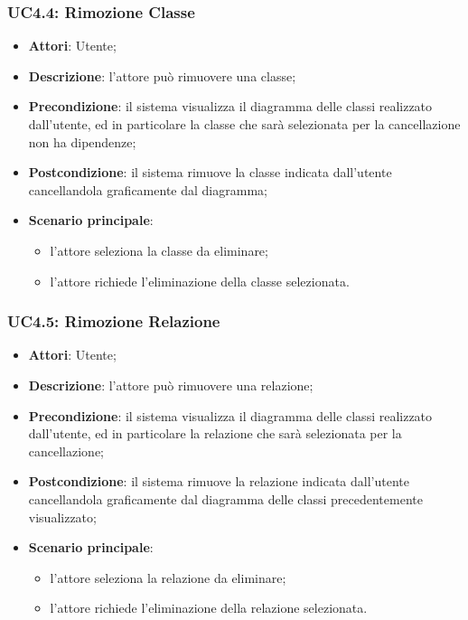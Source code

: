 \begin{itemize}
\begin{itemize}
\begin{itemize}
\begin{itemize}
\subsubsection{UC4.4: Rimozione Classe}
\label{UC4.4}
\begin{itemize}
	\item \textbf{Attori}: Utente;
	\item \textbf{Descrizione}: l'attore può rimuovere una classe;
	\item \textbf{Precondizione}: il sistema visualizza il diagramma delle classi realizzato dall'utente, ed in particolare la classe che sarà selezionata per la cancellazione non ha dipendenze;
	\item \textbf{Postcondizione}: il sistema rimuove la classe indicata dall'utente cancellandola graficamente dal diagramma;
	\item \textbf{Scenario principale}:
	\begin{itemize}
		\item l'attore seleziona la classe da eliminare;
		\item l'attore richiede l'eliminazione della classe selezionata.
	\end{itemize}
\end{itemize}

\subsubsection{UC4.5: Rimozione Relazione}
\label{UC4.5}
\begin{itemize}
	\item \textbf{Attori}: Utente;
	\item \textbf{Descrizione}: l'attore può rimuovere una relazione;
	\item \textbf{Precondizione}: il sistema visualizza il diagramma delle classi realizzato dall'utente, ed in particolare la relazione che sarà selezionata per la cancellazione;
	\item \textbf{Postcondizione}: il sistema rimuove la relazione indicata dall'utente cancellandola graficamente dal diagramma delle classi precedentemente visualizzato;
	\item \textbf{Scenario principale}:
	\begin{itemize}
		\item l'attore seleziona la relazione da eliminare;
		\item l'attore richiede l'eliminazione della relazione selezionata.
	\end{itemize}
\end{itemize}


\end{itemize}
\end{itemize}
\end{itemize}
\end{itemize}
